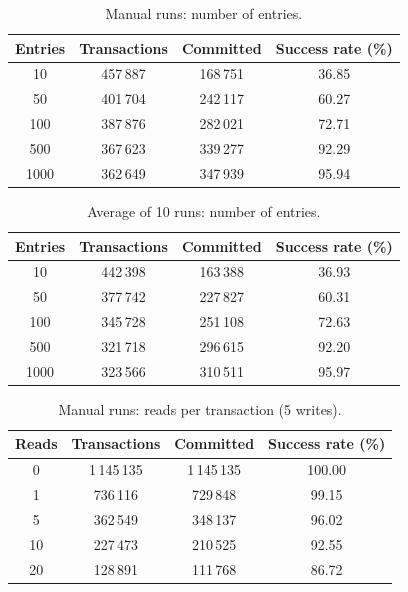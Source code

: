 \begin{table}[h]
\centering
\caption{Manual runs: number of entries.}
\begin{tabular}{|c|c|c|c|}
\hline
Entries & Transactions & Committed & Success rate (\%) \\
\hline
10 & 457\,887 & 168\,751 & 36.85 \\
50 & 401\,704 & 242\,117 & 60.27 \\
100 & 387\,876 & 282\,021 & 72.71 \\
500 & 367\,623 & 339\,277 & 92.29 \\
1000 & 362\,649 & 347\,939 & 95.94 \\
\hline
\end{tabular}
\end{table}

\begin{table}[h]
\centering
\caption{Average of 10 runs: number of entries.}
\begin{tabular}{|c|c|c|c|}
\hline
Entries & Transactions & Committed & Success rate (\%) \\
\hline
10 & 442\,398 & 163\,388 & 36.93 \\
50 & 377\,742 & 227\,827 & 60.31 \\
100 & 345\,728 & 251\,108 & 72.63 \\
500 & 321\,718 & 296\,615 & 92.20 \\
1000 & 323\,566 & 310\,511 & 95.97 \\
\hline
\end{tabular}
\end{table}

\begin{table}[h]
\centering
\caption{Manual runs: reads per transaction (5 writes).}
\begin{tabular}{|c|c|c|c|}
\hline
Reads & Transactions & Committed & Success rate (\%) \\
\hline
0 & 1\,145\,135 & 1\,145\,135 & 100.00 \\
1 & 736\,116 & 729\,848 & 99.15 \\
5 & 362\,549 & 348\,137 & 96.02 \\
10 & 227\,473 & 210\,525 & 92.55 \\
20 & 128\,891 & 111\,768 & 86.72 \\
\hline
\end{tabular}
\end{table}

